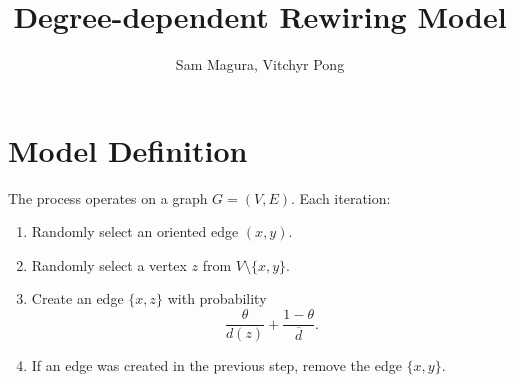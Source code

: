 \documentclass[a4paper,10pt]{article}
\title{Degree-dependent Rewiring Model}
\author{Sam Magura, Vitchyr Pong}
\begin{document}
\maketitle

\section{Model Definition}

The process operates on a graph $G = (V, E)$. Each iteration:

\begin{enumerate}
 \item Randomly select an oriented edge $(x, y)$.
 \item Randomly select a vertex $z$ from $V \setminus \{x, y\}$.
 \item Create an edge $\{x, z\}$ with probability
\begin{equation}
 \frac{\theta}{d(z)} + \frac{1 - \theta}{\overline{d}}.
\end{equation}
 \item If an edge was created in the previous step, remove the edge $\{x, y\}$.
\end{enumerate}
\end{document}
